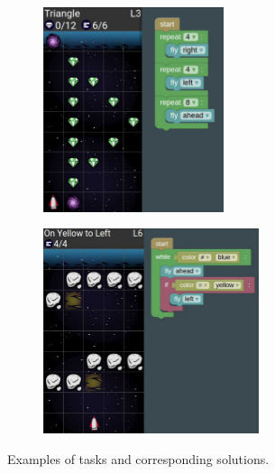 

\begin{figure}[htb]
\centering
\begin{subfigure}[t]{0.5\textwidth}
\centering
\includegraphics[height=60mm]{img/robomission-task-repeat}
\end{subfigure}%
\begin{subfigure}[t]{0.5\textwidth}
\centering
\includegraphics[height=60mm]{img/robomission-task-conditions}
\end{subfigure}
\caption{Examples of tasks and corresponding solutions.}
\label{fig:tasks-solutions}
\end{figure}


